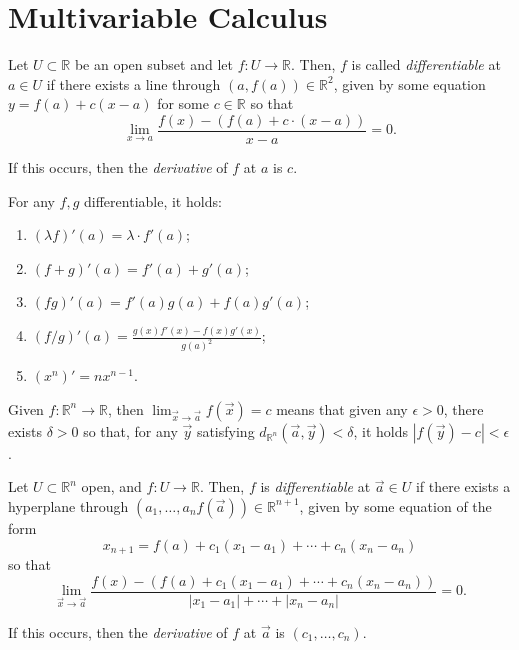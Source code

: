 \newpage
\section{Multivariable Calculus}

\begin{defn}
	Let $U \subset \mathbb{R}$ be an open subset and let $f: U \to \mathbb{R}$. Then, $f$ is called \emph{differentiable} at $a \in U$ if there exists a line through $(a, f(a)) \in \mathbb{R}^2$, given by some equation $y = f(a) + c (x-a)$ for some $c \in \mathbb{R}$ so that \[
		\lim_{x \to a} \frac{f(x) - (f(a) + c\cdot(x-a))}{x-a} = 0.
	\]
	
	If this occurs, then the \emph{derivative} of $f$ at $a$ is $c$.
\end{defn}

\begin{prop}
	For any $f, g$ differentiable, it holds:
	\begin{enumerate}[label = (\alph*)]
		\item $(\lambda f)'(a) = \lambda \cdot f'(a)$;
		\item $(f + g)'(a) = f'(a) + g'(a)$;
		\item $(fg)'(a) = f'(a)g(a) + f(a)g'(a)$;
		\item $(f/g)'(a) = \frac{g(x)f'(x) - f(x)g'(x)}{g(a)^2}$;
		\item $(x^n)' = nx^{n-1}$.
	\end{enumerate}
\end{prop}

\begin{defn}
	Given $f: \mathbb{R}^n \to \mathbb{R}$, then $\lim_{\vec x \to \vec a}f(\vec x) = c$ means that given any $\epsilon > 0$, there exists $\delta >  0$ so that, for any $\vec{y}$ satisfying $d_{\mathbb{R}^n}(\vec a, \vec y) < \delta$, it holds $|f(\vec y) - c| < \epsilon$.
\end{defn}

\begin{defn}
	Let $U \subset \mathbb{R}^n$ open, and $f: U \to \mathbb{R}$. Then, $f$ is \emph{differentiable} at $\vec{a} \in U$ if there exists a hyperplane through $(a_1, \dots, a_n f(\vec{a})) \in \mathbb{R}^{n+1}$, given by some equation of the form \[
		x_{n+1} = f(a) + c_1(x_1 - a_1) + \cdots + c_n(x_n - a_n)
	\] so that \[
	\lim_{\vec x \to \vec a} \frac{f(x) - (f(a) + c_1(x_1 - a_1) + \cdots + c_n(x_n - a_n))}{|x_1 - a_1| + \cdots + |x_n - a_n|} = 0.
	\]

	If this occurs, then the \emph{derivative} of $f$ at $\vec a$ is $(c_1, \dots, c_n)$.
\end{defn}

